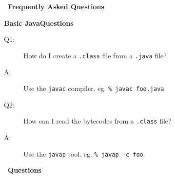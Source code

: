 \begin{center}
{\bf \jp\ Frequently Asked Questions}
\end{center}

{\bf Basic Java\trademark Questions}
\begin{description}
\item [Q1:] How do I create a {\tt .class} file from a {\tt .java} file?
\item [A:] Use the {\tt javac} compiler.  eg. {\tt \% javac foo.java} \\
\item [Q2:] How can I read the bytecodes from a {\tt .class} file?
\item [A:] Use the {\tt javap} tool.  eg. {\tt \% javap -c foo}.
\end{description}

{\bf \jp\ Questions}
